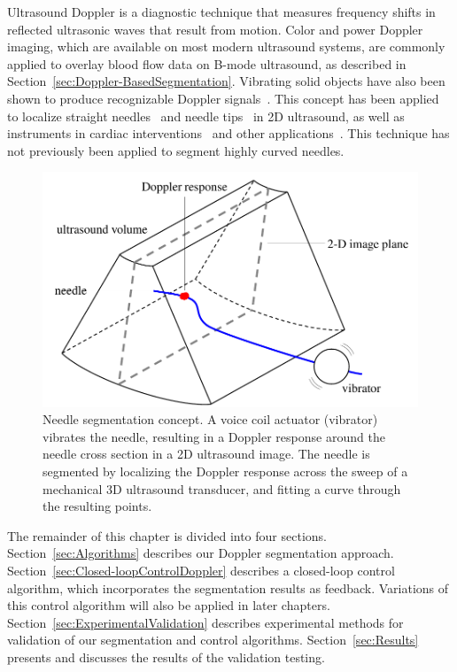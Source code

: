 Ultrasound Doppler is a diagnostic technique that measures frequency shifts in reflected ultrasonic waves that result from motion. Color and power Doppler imaging, which are available on most modern ultrasound systems, are commonly applied to overlay blood flow data on B-mode ultrasound, as described in Section~\ref{sec:Doppler-BasedSegmentation}. Vibrating solid objects have also been shown to produce recognizable Doppler signals~\cite{Holen1985}. This concept has been applied to localize straight needles~\cite{Armstrong2001,Feld1997,Hamper1991} and needle tips~\cite{Harmat2006} in 2D ultrasound, as well as instruments in cardiac interventions~\cite{Fronheiser2008,Reddy2008} and other applications~\cite{McAleavey2003,Rogers2009}. This technique has not previously been applied to segment highly curved needles.

\begin{figure}[!t]
\centering
\includegraphics[width = 0.75\columnwidth]{Images/Chapter2/SliceConcept/SliceConcept}%
\caption[3D ultrasound segmentation concept]{Needle segmentation concept. A voice coil actuator (vibrator) vibrates the needle, resulting in a Doppler response around the needle cross section in a 2D ultrasound image. The needle is segmented by localizing the Doppler response across the sweep of a mechanical 3D ultrasound transducer, and fitting a curve through the resulting points.}
\label{fig:SliceConcept}
\end{figure}

The remainder of this chapter is divided into four sections. Section~\ref{sec:Algorithms} describes our Doppler segmentation approach. Section~\ref{sec:Closed-loopControlDoppler} describes a closed-loop control algorithm, which incorporates the segmentation results as feedback. Variations of this control algorithm will also be applied in later chapters. Section~\ref{sec:ExperimentalValidation} describes experimental methods for validation of our segmentation and control algorithms. Section~\ref{sec:Results} presents and discusses the results of the validation testing.

